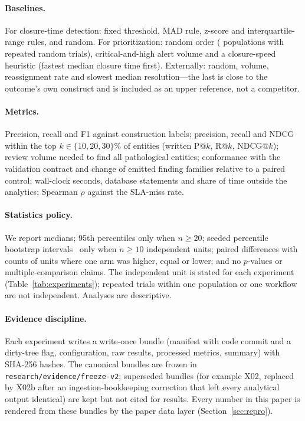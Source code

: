 \paragraph{Baselines.}
For closure-time detection: fixed threshold, MAD rule, z-score and
interquartile-range rules, and random. For prioritization: random order
( populations with repeated random trials), critical-and-high alert volume and a
closure-speed heuristic (fastest median closure time first). Externally: random, volume,
reassignment rate and slowest median resolution---the last is close to the
outcome's own construct and is included as an upper reference, not a competitor.

\paragraph{Metrics.}
Precision, recall and F1 against construction labels; precision, recall and
NDCG~\citep{jarvelin2002ndcg} within the top $k\in\{10,20,30\}$\% of entities
(written P@$k$, R@$k$, NDCG@$k$);
review volume needed to find all pathological entities; conformance with the
validation contract and change of emitted finding families relative to a paired control;
wall-clock seconds, database statements and share of time outside the analytics;
Spearman $\rho$ against the SLA-miss rate.

\paragraph{Statistics policy.}
We report medians; 95th percentiles only when $n\ge20$; seeded percentile
bootstrap intervals~\citep{efron1993bootstrap} only when $n\ge10$ independent
units; paired differences with counts of units where one arm was higher, equal or
lower; and no $p$-values or multiple-comparison claims. The independent unit is
stated for each experiment (Table~\ref{tab:experiments}); repeated trials within
one population or one workflow are not independent. Analyses are descriptive.

\paragraph{Evidence discipline.}
Each experiment writes a write-once bundle (manifest with code commit and a
dirty-tree flag, configuration, raw results, processed metrics, summary) with
SHA-256 hashes. The canonical bundles are frozen in
\texttt{research/evidence/freeze-v2}; superseded bundles (for example X02,
replaced by X02b after an ingestion-bookkeeping correction that left every
analytical output identical) are kept but not cited for results.
Every number in this paper is rendered from these bundles by the paper data layer
(Section~\ref{sec:repro}).
